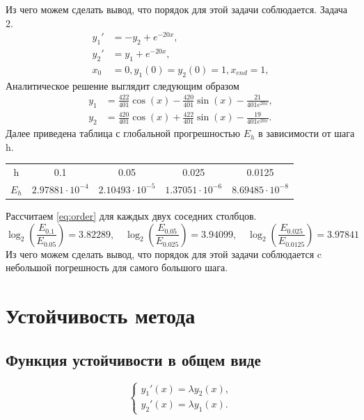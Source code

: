 \documentclass[a4paper,article,14pt]{extarticle}
\begin{document}
Из чего можем сделать вывод, что порядок для этой задачи соблюдается. \newline
Задача 2.
\begin{equation}
\begin{aligned}
    y_{1}' &= -y_{2} + e^{-20x}, \\
    y_{2}' &= y_{1} + e^{-20x}, \\
    x_{0} &= 0, y_{1}(0) = y_{2}(0) = 1, x_{end} = 1,
\end{aligned}
\end{equation}
Аналитическое решение выглядит следующим образом
\begin{equation}
\begin{aligned}
    y_{1} &= \frac{422}{401} \cos(x) - \frac{420}{401} \sin(x) - \frac{21}{401 e^{20x}}, \\
    y_{2} &= \frac{420}{401} \cos(x) + \frac{422}{401} \sin(x) - \frac{19}{401 e^{20x}}.
\end{aligned}
\end{equation}
Далее приведена таблица с глобальной прогрешностью $E_{h}$ в зависимости от шага h.
\begin{center}
\begin{tabular}{ |c|c|c|c|c| } 
\hline
h & 0.1& 0.05 & 0.025 & 0.0125 \\ 
$E_{h}$ & $2.97881\cdot10^{-4}$ & $2.10493\cdot10^{-5}$ & $1.37051\cdot10^{-6}$ & $8.69485\cdot10^{-8}$ \\ 
\hline
\end{tabular}
\end{center}
Рассчитаем \ref{eq:order} для каждых двух соседних столбцов.
\begin{equation}
\log_{2}(\frac{E_{0.1}}{E_{0.05}}) = 3.82289 , \quad \log_{2}(\frac{E_{0.05}}{E_{0.025}}) = 3.94099 , \quad \log_{2}(\frac{E_{0.025}}{E_{0.0125}}) = 3.97841
\end{equation}
Из чего можем сделать вывод, что порядок для этой задачи соблюдается c небольшой погрешность для самого большого шага.
\pagebreak

\section{Устойчивость метода}
\subsection{Функция устойчивости в общем виде}
\begin{equation}
\begin{cases}
    y_{1}'(x) = \lambda y_{2}(x), \\
    y_{2}'(x) = \lambda y_{1}(x).
\end{cases}
\label{eq:test_system}
\end{equation}
\end{document}
